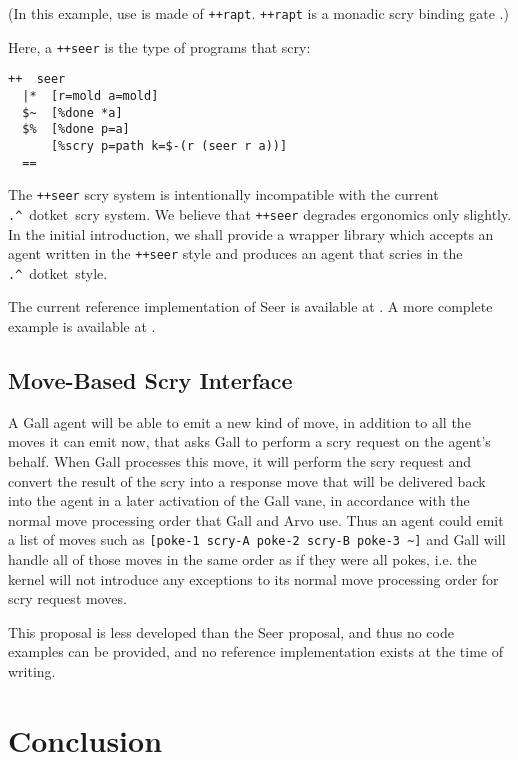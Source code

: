 \documentclass[twoside]{article}
\newcommand{\dotket}{\lstinline[style=inlinecode]{.^}~dotket}
\begin{document}
\noindent
(In this example, use is made of \lstinline[style=inlinecode]{++rapt}.  \lstinline[style=inlinecode]{++rapt} is a monadic scry binding gate \citep{Levan2023b}.)

Here, a \lstinline[style=inlinecode]{++seer} is the type of programs that scry:

\begin{lstlisting}[style=listingcode]
++  seer
  |*  [r=mold a=mold]
  $~  [%done *a]
  $%  [%done p=a]
      [%scry p=path k=$-(r (seer r a))]
  ==
\end{lstlisting}

The \lstinline[style=inlinecode]{++seer} scry system is intentionally incompatible with the current \dotket~scry system.  We believe that \lstinline[style=inlinecode]{++seer} degrades ergonomics only slightly.  In the initial introduction, we shall provide a wrapper library which accepts an agent written in the \lstinline[style=inlinecode]{++seer} style and produces an agent that scries in the \dotket~style.

The current reference implementation of Seer is available at \citet{Levan2023}.  A more complete example is available at \citet{Levan2023a}.

\subsection{Move-Based Scry Interface}

A Gall agent will be able to emit a new kind of move, in addition to all the moves it can emit now, that asks Gall to perform a scry request on the agent's behalf.  When Gall processes this move, it will perform the scry request and convert the result of the scry into a response move that will be delivered back into the agent in a later activation of the Gall vane, in accordance with the normal move processing order that Gall and Arvo use.  Thus an agent could emit a list of moves such as \lstinline[style=inlinecode]{[poke-1 scry-A poke-2 scry-B poke-3 ~]} and Gall will handle all of those moves in the same order as if they were all pokes, i.e. the kernel will not introduce any exceptions to its normal move processing order for scry request moves.

This proposal is less developed than the Seer proposal, and thus no code examples can be provided, and no reference implementation exists at the time of writing.


\section{Conclusion}
\end{document}
